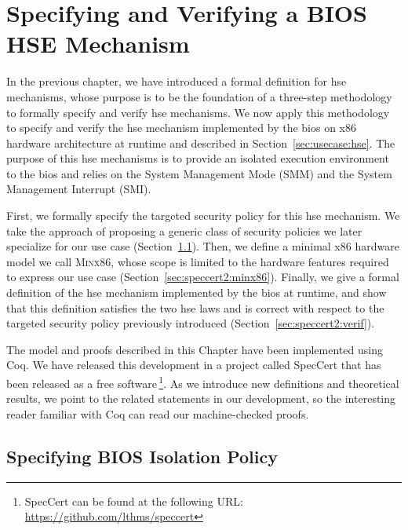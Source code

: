 \chapter{Specifying and Verifying a BIOS HSE Mechanism}
\label{chapter:speccert2}


\vspace{1cm}\noindent
%
In the previous chapter, we have introduced a formal definition for \ac{hse}
mechanisms, whose purpose is to be the foundation of a three-step methodology to
formally specify and verify \ac{hse} mechanisms.
%
We now apply this methodology to specify and verify the \ac{hse} mechanism
implemented by the \ac{bios} on x86 hardware architecture at runtime and
described in Section~\ref{sec:usecase:hse}.
%
The purpose of this \ac{hse} mechanisms is to provide an isolated execution
environment to the \ac{bios} and relies on the System Management Mode (SMM) and
the System Management Interrupt (SMI).

First, we formally specify the targeted security policy for this \ac{hse}
mechanism.
%
We take the approach of proposing a generic class of security policies we later
specialize for our use case (Section~\ref{sec:speccert2:usecase}).
%
Then, we define a minimal x86 hardware model we call {\scshape Minx86}, whose
scope is limited to the hardware features required to express our use case
(Section~\ref{sec:speccert2:minx86}).
%
Finally, we give a formal definition of the \ac{hse} mechanism implemented by
the \ac{bios} at runtime, and show that this definition satisfies the two
\ac{hse} laws and is correct with respect to the targeted security policy
previously introduced (Section~\ref{sec:speccert2:verif}).

The model and proofs described in this Chapter have been implemented using Coq.
%
We have released this development in a project called SpecCert that has been
released as a free software\,\footnote{SpecCert can be found at the following
  URL: \url{https://github.com/lthms/speccert}}.
%
As we introduce new definitions and theoretical results, we point to the related
statements in our development, so the interesting reader familiar with Coq can
read our machine-checked proofs.

\section{Specifying BIOS Isolation Policy}
\label{sec:speccert2:usecase}

